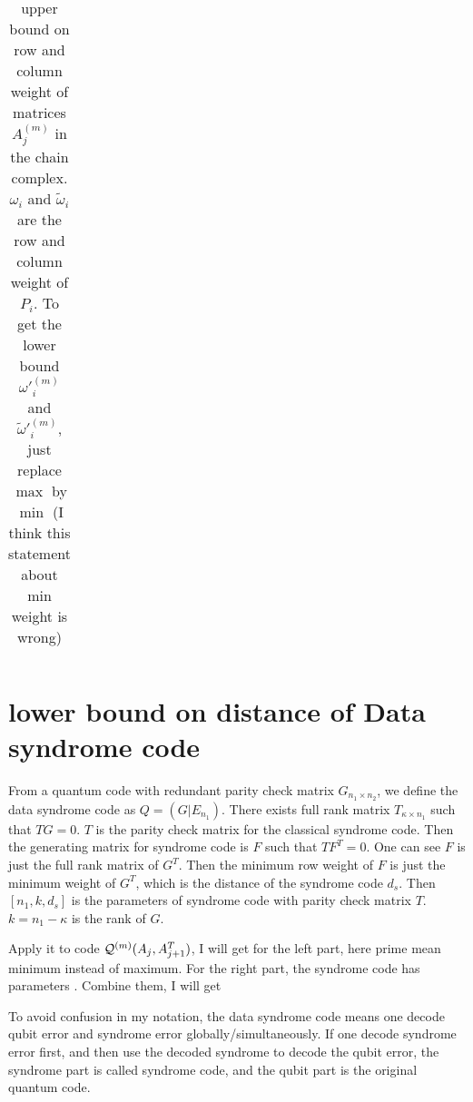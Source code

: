 \documentclass[aps,prb,12pt,tightenlines,%
notitlepage,longbibliography]{revtex4-1}
\begin{document}
\begin{table}[htbp]
\begin{tabular}[c]{c||c|c|c|c}
\end{tabular}
  \caption{upper bound on row and column weight of matrices $A^{(m)}_j$ in the chain complex. $\omega_i$ and $\tilde\omega_i$ are the row and column weight of $P_i$.  To get the lower bound $\omega'^{(m)}_i$ and $\tilde\omega'^{(m)}_i$, just replace $\max$ by $\min$ (I think this statement about min weight is wrong)
  }
  \label{tab:weight}
\end{table}


\section{lower bound on distance of Data syndrome code}
From a quantum code with redundant parity check matrix $G_{n_1 \times n_2}$, we define the data syndrome code as $Q=( G|E_{n_1} )$. There exists full rank matrix $T_{\kappa \times n_1}$ such that $TG=0$. $T$ is the parity check matrix for the classical syndrome code. Then the generating matrix for syndrome code is $F$ such that $TF^T=0$. One can see $F$ is just the full rank matrix of $G^T$. Then the minimum row weight of $F$ is just the minimum weight of $G^T$, which is the distance of the syndrome code $d_s$. Then $[n_1,k,d_s]$ is the parameters of syndrome code with parity check matrix $T$. $k=n_1-\kappa$ is the rank of $G$.

Apply it to code $ {\cal Q}^{(m)}(A_{j},A_{j+1}^T)$, I will get  for the left part, here prime mean minimum instead of maximum. For the right part, the syndrome code has parameters  . Combine them, I will get  

To avoid confusion in my notation, the data syndrome code means one decode qubit error and syndrome error globally/simultaneously. If one decode syndrome error first, and then use the decoded syndrome to decode the qubit error,  the syndrome part is called syndrome code, and the qubit part is the original quantum code.
\end{document}
